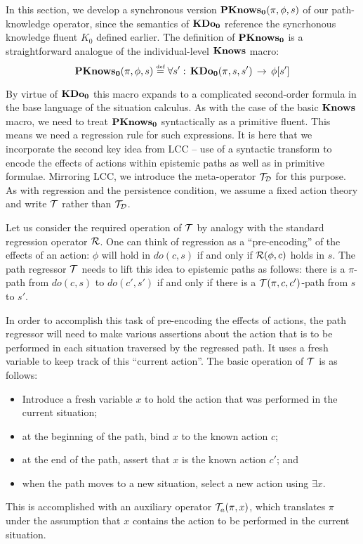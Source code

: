 In this section, we develop a synchronous version $\mathbf{PKnows_{0}}(\pi,\phi,s)$
of our path-knowledge operator, since the semantics of $\mathbf{KDo_{0}}$ reference
the syncrhonous knowledge fluent $K_{0}$ defined earlier. The definition
of $\mathbf{PKnows_{0}}$ is a straightforward analogue of the individual-level
$\mathbf{Knows}$ macro:\[
\mathbf{PKnows_{0}}(\pi,\phi,s)\stackrel{\mbox{\tiny def}}{=}\forall s':\,\mathbf{KDo_{0}}(\pi,s,s')\,\rightarrow\,\phi[s']\]


By virtue of $\mathbf{KDo_{0}}$ this macro expands to a complicated second-order
formula in the base language of the situation calculus. As with the
case of the basic $\mathbf{Knows}$ macro, we need to treat $\mathbf{PKnows_{0}}$ syntactically
as a primitive fluent. This means we need a regression rule for such
expressions. It is here that we incorporate the second key idea from
LCC -- use of a syntactic transform to encode the effects of actions
within epistemic paths as well as in primitive formulae. Mirroring
LCC, we introduce the meta-operator $\mathcal{T}_{\mathcal{D}}$ for this purpose.
As with regression and the persistence condition, we assume a fixed
action theory and write $\mathcal{T}$ rather than $\mathcal{T}_{\mathcal{D}}$.

Let us consider the required operation of $\mathcal{T}$ by analogy with
the standard regression operator $\mathcal{R}$. One can think of regression
as a {}``pre-encoding'' of the effects of an action: $\phi$ will
hold in $do(c,s)$ if and only if $\mathcal{R}(\phi,c)$ holds in $s$. The
path regressor $\mathcal{T}$ needs to lift this idea to epistemic paths
as follows: there is a $\pi$-path from $do(c,s)$ to $do(c',s')$
if and only if there is a $\mathcal{T}(\pi,c,c')$-path from $s$ to $s'$.

In order to accomplish this task of pre-encoding the effects of actions,
the path regressor will need to make various assertions about the
action that is to be performed in each situation traversed by the
regressed path. It uses a fresh variable to keep track of this {}``current
action''. The basic operation of $\mathcal{T}$ is as follows:

\begin{itemize}
\item Introduce a fresh variable $x$ to hold the action that was performed
in the current situation; 
\item at the beginning of the path, bind $x$ to the known action $c$; 
\item at the end of the path, assert that $x$ is the known action $c'$;
and 
\item when the path moves to a new situation, select a new action using
$\exists x$. 
\end{itemize}
This is accomplished with an auxiliary operator $\mathcal{T}_{a}(\pi,x)$, which
translates $\pi$ under the assumption that $x$ contains the action
to be performed in the current situation.

